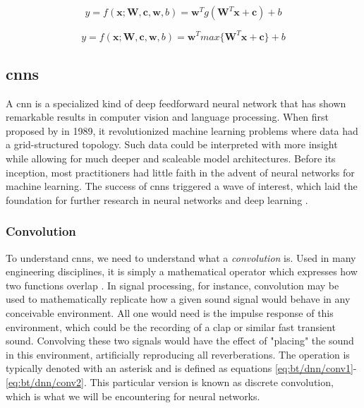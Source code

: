 \begin{equation}
    \label{eq:bt/dnn/mlp2}
    y=f(\bm{x};\bm{W},\bm{c}, \bm{w}, b)=\bm{w}^Tg(\bm{W}^T\bm{x}+\bm{c}) + b
\end{equation}

\begin{equation}
    \label{eq:bt/dnn/mlp3}
    y=f(\bm{x};\bm{W},\bm{c}, \bm{w}, b)=\bm{w}^Tmax\{\bm{W}^T\bm{x}+\bm{c}\} + b
\end{equation}

\newpage
\subsection{\acrlong{cnn}s}

A \acrfull{cnn} is a specialized kind of deep feedforward neural network that has shown remarkable results in computer vision and language processing. When first proposed by \textcite{lecun1989} in 1989, it revolutionized machine learning problems where data had a grid-structured topology. Such data could be interpreted with more insight while allowing for much deeper and scaleable model architectures. Before its inception, most practitioners had little faith in the advent of neural networks for machine learning. The success of \acrshort{cnn}s triggered a wave of interest, which laid the foundation for further research in neural networks and deep learning \cite{goodfellow2016}.

\subsubsection{Convolution}

To understand \acrshort{cnn}s, we need to understand what a \textit{convolution} is. Used in many engineering disciplines, it is simply a mathematical operator which expresses how two functions overlap \cite{weisstein2003}. In signal processing, for instance, convolution may be used to mathematically replicate how a given sound signal would behave in any conceivable environment. All one would need is the impulse response of this environment, which could be the recording of a clap or similar fast transient sound. Convolving these two signals would have the effect of "placing" the sound in this environment, artificially reproducing all reverberations. The operation is typically denoted with an asterisk and is defined as equations \ref{eq:bt/dnn/conv1}-\ref{eq:bt/dnn/conv2}. This particular version is known as discrete convolution, which is what we will be encountering for neural networks.

